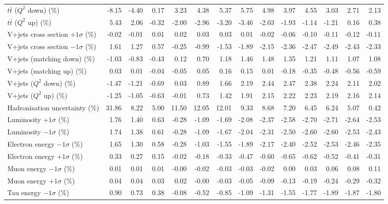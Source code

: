 \begin{table}[htbp]
{\begin{tabular}{lrrrrrrrrrrrrr}
$t\bar{t}$ ($Q^{2}$ down) (\%) & -8.15 & -4.40 & 0.17 & 3.23 & 4.38 & 5.37 & 5.75 & 4.98 & 3.97 & 4.55 & 3.03 & 2.71 & 2.13 \\ 
$t\bar{t}$ ($Q^{2}$ up) (\%) & 5.43 & 2.06 & -0.32 & -2.00 & -2.96 & -3.20 & -3.46 & -2.03 & -1.93 & -1.14 & -1.21 & 0.16 & 0.38 \\ 
V+jets cross section \ensuremath{+1\sigma} (\%) & -0.02 & -0.01 & 0.01 & 0.02 & 0.03 & 0.03 & 0.01 & -0.02 & -0.06 & -0.10 & -0.11 & -0.12 & -0.11 \\ 
V+jets cross section \ensuremath{-1\sigma} (\%) & 1.61 & 1.27 & 0.57 & -0.25 & -0.99 & -1.53 & -1.89 & -2.15 & -2.36 & -2.47 & -2.49 & -2.43 & -2.33 \\ 
V+jets (matching down) (\%) & -1.03 & -0.83 & -0.43 & 0.12 & 0.70 & 1.18 & 1.46 & 1.48 & 1.35 & 1.21 & 1.11 & 1.07 & 1.08 \\ 
V+jets (matching up) (\%) & 0.03 & 0.01 & -0.04 & -0.05 & 0.05 & 0.16 & 0.15 & 0.01 & -0.18 & -0.35 & -0.48 & -0.56 & -0.59 \\ 
V+jets ($Q^{2}$ down) (\%) & -1.47 & -1.21 & -0.69 & 0.03 & 0.89 & 1.66 & 2.19 & 2.44 & 2.47 & 2.38 & 2.24 & 2.11 & 2.02 \\ 
V+jets ($Q^{2}$ up) (\%) & -1.25 & -1.05 & -0.63 & -0.01 & 0.73 & 1.42 & 1.91 & 2.15 & 2.22 & 2.23 & 2.19 & 2.16 & 2.14 \\ 
Hadronisation uncertainty (\%) & 31.86 & 8.22 & 5.00 & 11.50 & 12.05 & 12.01 & 9.33 & 8.68 & 7.20 & 6.45 & 6.24 & 5.07 & 0.42 \\ 
Luminosity $+1\sigma$ (\%) & 1.76 & 1.40 & 0.63 & -0.28 & -1.09 & -1.69 & -2.08 & -2.37 & -2.58 & -2.70 & -2.71 & -2.64 & -2.53 \\ 
Luminosity $-1\sigma$ (\%) & 1.74 & 1.38 & 0.61 & -0.28 & -1.09 & -1.67 & -2.04 & -2.31 & -2.50 & -2.60 & -2.60 & -2.53 & -2.43 \\ 
Electron energy $-1\sigma$ (\%) & 1.65 & 1.30 & 0.58 & -0.28 & -1.03 & -1.55 & -1.89 & -2.17 & -2.40 & -2.52 & -2.53 & -2.46 & -2.35 \\ 
Electron energy $+1\sigma$ (\%) & 0.33 & 0.27 & 0.15 & -0.02 & -0.18 & -0.33 & -0.47 & -0.60 & -0.65 & -0.62 & -0.52 & -0.41 & -0.31 \\ 
Muon energy $-1\sigma$ (\%) & 0.01 & 0.01 & 0.01 & -0.00 & -0.02 & -0.03 & -0.03 & -0.02 & 0.00 & 0.03 & 0.06 & 0.08 & 0.11 \\ 
Muon energy $+1\sigma$ (\%) & 0.04 & 0.04 & 0.03 & 0.02 & -0.00 & -0.03 & -0.05 & -0.09 & -0.13 & -0.19 & -0.24 & -0.29 & -0.32 \\ 
Tau energy $-1\sigma$ (\%) & 0.90 & 0.73 & 0.38 & -0.08 & -0.52 & -0.85 & -1.09 & -1.31 & -1.55 & -1.77 & -1.89 & -1.87 & -1.80 \\ 

\end{tabular}}
\end{table}
